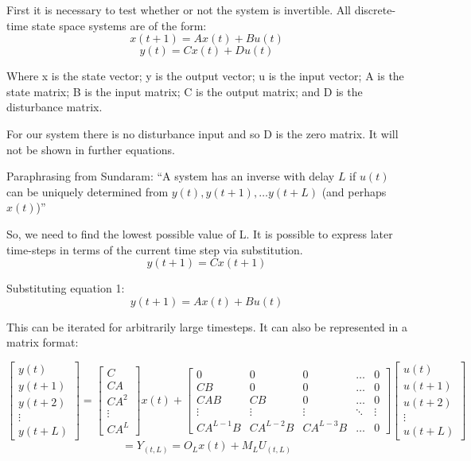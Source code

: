 \documentclass{report}
\begin{document}
First it is necessary to test whether or not the system is invertible. All discrete-time state space systems are of the form:
\begin{equation}
	x(t+1)=Ax(t)+Bu(t)
\end{equation}
\begin{equation}
	y(t)=Cx(t)+Du(t)
\end{equation}

Where x is the state vector; y is the output vector; u is the input vector; A is the state matrix; B is the input matrix; C is the output matrix; and D is the disturbance matrix.

For our system there is no disturbance input and so D is the zero matrix. It will not be shown in further equations.

Paraphrasing from Sundaram:
“A system has an inverse with delay $L$ if $u(t)$ can be uniquely determined from $y(t),y(t+1),…y(t+L)$  (and perhaps $x(t)$)”

So, we need to find the lowest possible value of L. It is possible to express later time-steps in terms of the current time step via substitution.
\[					%
	y(t+1)=Cx(t+1)
\]

Substituting equation 1:
\[
	y(t+1)= Ax(t)+Bu(t)
\]

This can be iterated for arbitrarily large timesteps. It can also be represented in a matrix format:

\[
	\begin{bmatrix}
		y(t)   \\
		y(t+1) \\
		y(t+2) \\
		\vdots \\
		y(t+L)
	\end{bmatrix}
	=
	\begin{bmatrix}
		C   \\
		CA  \\
		CA^2\\
		\vdots\\
		CA^L
	\end{bmatrix}
	x(t) +
	\left[
	\begin{array}{c|cccc}			%
	0&0&0&\hdots&0						\\
	CB&0&0&\hdots&0						\\
	CAB&CB&0&\hdots&0					\\
	\vdots&\vdots&\vdots&\ddots&\vdots	\\
	CA^{L-1}B & CA^{L-2}B & CA^{L-3}B & \hdots & 0
	\end{array}
	\right]
	\left[
	\begin{array}{c}
		u(t)		\\
		\hline
		u(t+1)		\\
		u(t+2)		\\
		\vdots		\\
		u(t+L)
	\end{array}
	\right]
\]
\begin{equation}
=Y_{(t,L)} = O_Lx(t)+M_L U_{(t,L)}
\end{equation}
\end{document}
